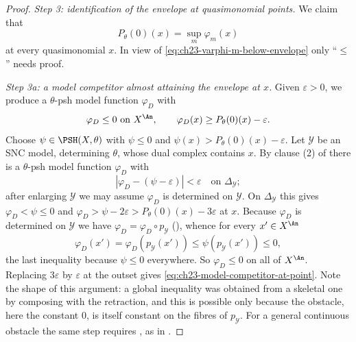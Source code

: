 \begin{proof}
\emph{Step 3: identification of the envelope at quasimonomial points.}
We claim that
\begin{equation}\label{eq:ch23-envelope-base-sup}
                         P_\theta(0)(x)=\sup_m\varphi_m(x)
\end{equation}
at every quasimonomial \(x\).  In view of
\eqref{eq:ch23-varphi-m-below-envelope} only ``\(\leq\)'' needs proof.

\emph{Step 3a: a model competitor almost attaining the envelope at \(x\).}
Given \(\varepsilon>0\), we produce a \(\theta\)-psh model function
\(\varphi_D\) with
\begin{equation}\label{eq:ch23-model-competitor-at-point}
             \varphi_D\leq 0\text{ on }X^{\An},
             \qquad
             \varphi_D(x)\geq P_\theta(0)(x)-\varepsilon.
\end{equation}
Choose \(\psi\in\PSH(X,\theta)\) with \(\psi\leq0\) and
\(\psi(x)>P_\theta(0)(x)-\varepsilon\).  Let \(\mathcal Y\) be an SNC model,
determining \(\theta\), whose dual complex contains \(x\).  By clause (2) of
 there is a \(\theta\)-psh model function
\(\varphi_D\) with
\[
 \left|\varphi_D-(\psi-\varepsilon)\right|<\varepsilon
 \quad\text{on }\Delta_{\mathcal Y};
\]
after enlarging \(\mathcal Y\) we may assume \(\varphi_D\) is determined on
\(\mathcal Y\).  On \(\Delta_{\mathcal Y}\) this gives
\(\varphi_D<\psi\leq0\) and
\(\varphi_D>\psi-2\varepsilon>P_\theta(0)(x)-3\varepsilon\) at \(x\).
Because \(\varphi_D\) is determined on \(\mathcal Y\) we have
\(\varphi_D=\varphi_D\circ p_{\mathcal Y}\)
(), whence for every
\(x'\in X^{\An}\)
\[
       \varphi_D(x')
       =\varphi_D(p_{\mathcal Y}(x'))
       \leq\psi(p_{\mathcal Y}(x'))\leq0 ,
\]
the last inequality because \(\psi\leq0\) everywhere.  So \(\varphi_D\leq0\)
on all of \(X^{\An}\).  Replacing \(3\varepsilon\) by \(\varepsilon\) at the
outset gives \eqref{eq:ch23-model-competitor-at-point}.  Note the shape of
this argument: a global inequality was obtained from a skeletal one by
composing with the retraction, and this is possible only because the
obstacle, here the constant \(0\), is itself constant on the fibres of
\(p_{\mathcal Y}\).  For a general continuous obstacle the same step
requires , as in
.


\end{proof}
